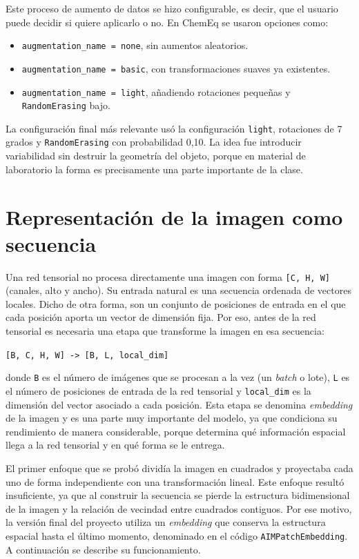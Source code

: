 Este proceso de aumento de datos se hizo configurable, es decir, que el usuario puede decidir si quiere aplicarlo o no. En ChemEq se usaron opciones como:

\begin{itemize}
    \item \texttt{augmentation\_name = none}, sin aumentos aleatorios.
    \item \texttt{augmentation\_name = basic}, con transformaciones suaves ya existentes.
    \item \texttt{augmentation\_name = light}, añadiendo rotaciones pequeñas y \texttt{RandomErasing} bajo.
\end{itemize}

La configuración final más relevante usó la configuración \texttt{light}, rotaciones de 7 grados y \texttt{RandomErasing} con probabilidad 0,10. La idea fue introducir variabilidad sin destruir la geometría del objeto, porque en material de laboratorio la forma es precisamente una parte importante de la clase.

\section{Representación de la imagen como secuencia}

Una red tensorial no procesa directamente una imagen con forma \texttt{[C, H, W]} (canales, alto y ancho). Su entrada natural es una secuencia ordenada de vectores locales. Dicho de otra forma, son un conjunto de posiciones de entrada en el que cada posición aporta un vector de dimensión fija. Por eso, antes de la red tensorial es necesaria una etapa que transforme la imagen en esa secuencia:

\begin{center}
\texttt{[B, C, H, W] -> [B, L, local\_dim]}
\end{center}

donde \texttt{B} es el número de imágenes que se procesan a la vez (un \textit{batch} o lote), \texttt{L} es el número de posiciones de entrada de la red tensorial y \texttt{local\_dim} es la dimensión del vector asociado a cada posición. Esta etapa se denomina \textit{embedding} de la imagen y es una parte muy importante del modelo, ya que condiciona su rendimiento de manera considerable, porque determina qué información espacial llega a la red tensorial y en qué forma se le entrega.

El primer enfoque que se probó dividía la imagen en cuadrados y proyectaba cada uno de forma independiente con una transformación lineal. Este enfoque resultó insuficiente, ya que al construir la secuencia se pierde la estructura bidimensional de la imagen y la relación de vecindad entre cuadrados contiguos. Por ese motivo, la versión final del proyecto utiliza un \textit{embedding} que conserva la estructura espacial hasta el último momento, denominado en el código \texttt{AIMPatchEmbedding}. A continuación se describe su funcionamiento.

